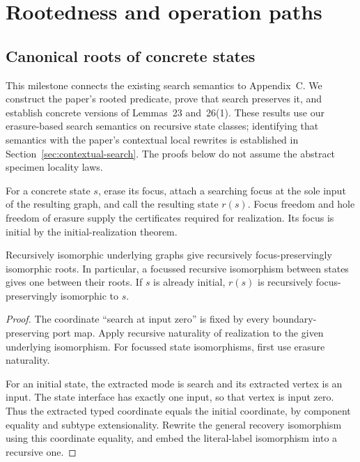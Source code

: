 \section{Rootedness and operation paths}
\label{sec:rootedness}

\subsection{Canonical roots of concrete states}
\label{sec:concrete-roots}
This milestone connects the existing search semantics to Appendix~C.
We construct the paper's rooted predicate, prove that search preserves it,
and establish concrete versions of Lemmas~23 and~26(1). These results use
our erasure-based search semantics on recursive state classes; identifying that
semantics with the paper's contextual local rewrites is established in
Section~\ref{sec:contextual-search}. The proofs below do not assume the abstract specimen locality laws.

\begin{definition}
For a concrete state $s$, erase its focus, attach a searching focus at the
sole input of the resulting graph, and call the resulting state $r(s)$.
Focus freedom and hole freedom of erasure supply the certificates required
for realization. Its focus is initial by the initial-realization theorem.
\end{definition}

\begin{lemma}
Recursively isomorphic underlying graphs give recursively focus-preservingly
isomorphic roots. In particular, a focussed recursive isomorphism between
states gives one between their roots. If $s$ is already initial, $r(s)$ is
recursively focus-preservingly isomorphic to $s$.
\end{lemma}
\begin{proof}
The coordinate ``search at input zero'' is fixed by every boundary-preserving
port map. Apply recursive naturality of realization to the given underlying
isomorphism. For focussed state isomorphisms, first use erasure naturality.

For an initial state, the extracted mode is search and its extracted vertex
is an input. The state interface has exactly one input, so that vertex is
input zero. Thus the extracted typed coordinate equals the initial coordinate,
by component equality and subtype extensionality. Rewrite the general recovery
isomorphism using this coordinate equality, and embed the literal-label
isomorphism into a recursive one.
\end{proof}

